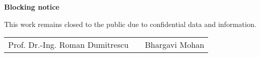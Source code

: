 \thispagestyle{empty}    %
\vspace*{8cm}
\fontsize{16pt}{18pt}\selectfont
\begin{center}
\sffamily
\bfseries
Blocking notice 
\vspace*{1cm}

This work remains closed to the public due to confidential data and information.
\end{center}
\vspace*{7.5cm}
\normalsize
\sffamily
	\begin{center}
		\begin{tabular}{l l r}
		  \cline{1-1} \cline{3-3}
		  \begin{minipage}[t]{0.5\textwidth}
		    \centering
		    Prof. Dr.-Ing. Roman Dumitrescu
			\end{minipage}
			&
			\begin{minipage}[t]{0\textwidth}
			\end{minipage}
			&
			\begin{minipage}[t]{0.5\textwidth}
			  \centering
			  Bhargavi Mohan
			\end{minipage}
		\end{tabular}
	\end{center}
\cleardoublepage